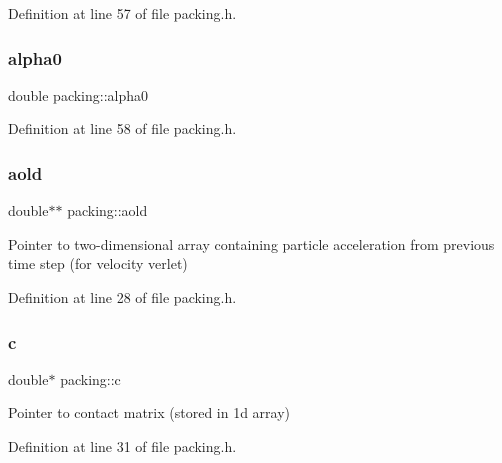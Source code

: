 Definition at line 57 of file packing.\+h.

\mbox{\label{classpacking_afa09f18e29cec06705f33a5253f1b016}} 
\subsubsection{\texorpdfstring{alpha0}{alpha0}}
{\footnotesize\ttfamily double packing\+::alpha0\hspace{0.3cm}{\ttfamily [protected]}}



Definition at line 58 of file packing.\+h.

\mbox{\label{classpacking_a16ab3555506f30e4848ca52ae1136444}} 
\subsubsection{\texorpdfstring{aold}{aold}}
{\footnotesize\ttfamily double$\ast$$\ast$ packing\+::aold\hspace{0.3cm}{\ttfamily [protected]}}



Pointer to two-\/dimensional array containing particle acceleration from previous time step (for velocity verlet) 



Definition at line 28 of file packing.\+h.

\mbox{\label{classpacking_a01db0c365f0f66bbc2de30fed7e1881a}} 
\subsubsection{\texorpdfstring{c}{c}}
{\footnotesize\ttfamily double$\ast$ packing\+::c\hspace{0.3cm}{\ttfamily [protected]}}



Pointer to contact matrix (stored in 1d array) 



Definition at line 31 of file packing.\+h.

\mbox{\label{classpacking_a5c104fd62aea53bee075d978dd6d9d6a}} 
